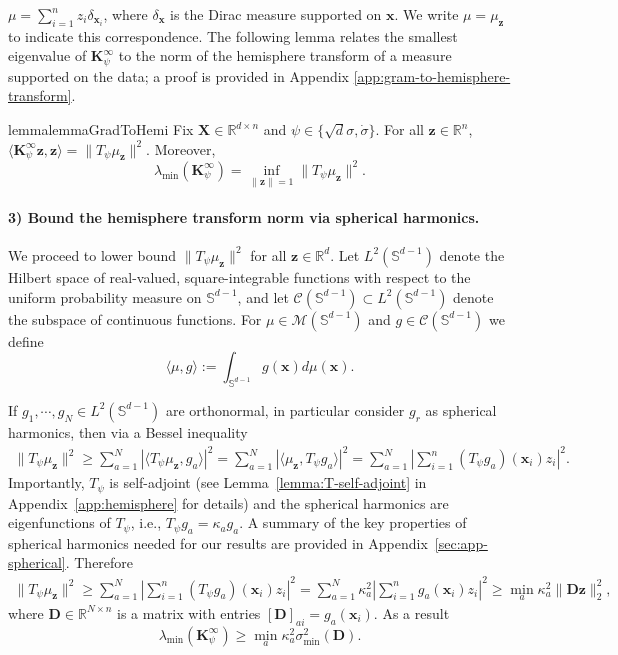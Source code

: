 \documentclass{article}
\theoremstyle{definition}
\newcommand*{\R}{\mathbb{R}}
\newcommand{\mc}{\mathcal}
\renewcommand{\S}{\mathbb{S}}
\def\vx{{\bm{x}}}
\def\vz{{\bm{z}}}
\def\mD{{\bm{D}}}
\def\mK{{\bm{K}}}
\def\mX{{\bm{X}}}
\begin{document}
$\mu = \sum_{i = 1}^n z_i \delta_{\vx_i}$, 
where $\delta_{\vx}$ is the Dirac measure supported on $\vx$. We write $\mu = \mu_{\vz}$ to indicate this correspondence. The following lemma relates the smallest eigenvalue of $\mK_{\psi}^{\infty}$ to the norm of the hemisphere transform of a measure supported on the data; a proof is provided in Appendix \ref{app:gram-to-hemisphere-transform}. 
\begin{restatable}{lemma}{lemmaGradToHemi}\label{lem:gram-to-hemisphere-transform}
 Fix $\mX \in \R^{d \times n}$ and $\psi \in \{\sqrt{d}\sigma, \dot{\sigma}\}$. 
    For all $\vz \in \R^n$, $\langle \mK_{\psi}^{\infty}\vz, \vz \rangle = \|T_{\psi}\mu_{\vz}\|^2$. Moreover,
    \[\lambda_{\min}(\mK_{\psi}^{\infty}) = \inf_{\|\vz\| = 1 }\|T_{\psi}\mu_{\vz}\|^2. \]
\end{restatable}

\paragraph{3) Bound the hemisphere transform norm via spherical harmonics.} We proceed to lower bound $\|T_{\psi} \mu_{\vz}\|^2$ for all $\vz \in \R^d$. Let $L^2(\S^{d - 1})$ denote the Hilbert space of real-valued, square-integrable functions with respect to the uniform probability measure on $\S^{d - 1}$, and let $\mc{C}(\S^{d - 1}) \subset L^2(\S^{d - 1})$ denote the subspace of continuous functions. For $\mu \in \mc{M}(\S^{d -1 })$ and $g \in \mc{C}(\S^{d - 1})$ we define 
\begin{equation*}
    \langle \mu, g \rangle := \int_{\S^{d-1}} {g(\vx)}d\mu(\vx) . 
\end{equation*}

If $g_1, \cdots, g_N \in L^2(\S^{d -1 })$ are orthonormal, in particular consider $g_r$ as spherical harmonics, then via a Bessel inequality 
\begin{align*}
    \|T_{\psi}\mu_{\vz}\|^2 \geq \sum_{a = 1}^N |\langle T_{\psi}\mu_{\vz}, g_a \rangle|^2
    = \sum_{a = 1}^N |\langle \mu_{\vz}, T_{\psi}g_a \rangle|^2
    = \sum_{a = 1}^N \left|\sum_{i = 1}^n  (T_{\psi} g_a)(\vx_i) z_i\right|^2.
\end{align*}
Importantly, $T_{\psi}$ is self-adjoint (see Lemma~\ref{lemma:T-self-adjoint} in Appendix~\ref{app:hemisphere} for details) and the spherical harmonics are eigenfunctions of $T_{\psi}$, i.e., $T_{\psi} g_a = \kappa_a g_a$. A summary of the key properties of spherical harmonics needed for our results are provided in Appendix~\ref{sec:app-spherical}. Therefore
\begin{align*}
    \|T_{\psi}\mu_{\vz}\|^2 \geq \sum_{a = 1}^N \left|\sum_{i = 1}^n  (T_{\psi} g_a)(\vx_i) z_i\right|^2 = \sum_{a = 1}^N \kappa_a^2 \left|\sum_{i = 1}^n  g_a(\vx_i) z_i\right|^2 \geq \min_a \kappa_a^2 \| \mD \vz \|_2^2 , 
\end{align*}
where $\mD \in \R^{N \times n}$ is a matrix with entries $[\mD]_{ai} = g_a(\vx_i)$. As a result 
\[
\lambda_{\min}(\mK_{\psi}^{\infty}) \geq \min_a \kappa_a^2 \sigma^2_{\min}(\mD).
\]
\end{document}
